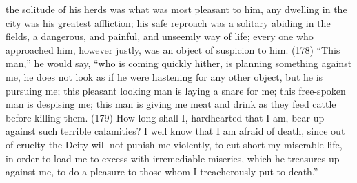 the solitude of his herds was what was most pleasant to him, any dwelling in the city was his
greatest affliction; his safe reproach was a solitary abiding in the fields, a dangerous, and painful,
and unseemly way of life; every one who approached him, however justly, was an object of
suspicion to him. (178) ``This man,'' he would say, ``who is coming quickly hither, is planning
something against me, he does not look as if he were hastening for any other object, but he is
pursuing me; this pleasant looking man is laying a snare for me; this free-spoken man is despising
me; this man is giving me meat and drink as they feed cattle before killing them. (179) How long
shall I, hardhearted that I am, bear up against such terrible calamities? I well know that I am afraid
of death, since out of cruelty the Deity will not punish me violently, to cut short my miserable life, in
order to load me to excess with irremediable miseries, which he treasures up against me, to do a
pleasure to those whom I treacherously put to death.''

